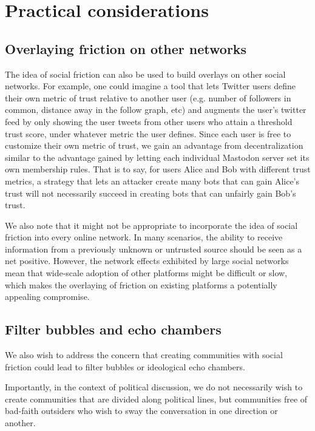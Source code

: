\documentclass[sigconf,authordraft]{acmart}
\begin{document}
\section{Practical considerations}

\subsection{Overlaying friction on other networks}

The idea of social friction can also be used to build overlays on other social networks. For example, one could imagine a tool that lets Twitter users define their own metric of trust relative to another user (e.g. number of followers in common, distance away in the follow graph, etc) and augments the user's twitter feed by only showing the user tweets from other users who attain a threshold trust score, under whatever metric the user defines. Since each user is free to customize their own metric of trust, we gain an advantage from decentralization similar to the advantage gained by letting each individual Mastodon server set its own membership rules. That is to say, for users Alice and Bob with different trust metrics, a strategy that lets an attacker create many bots that can gain Alice's trust will not necessarily succeed in creating bots that can unfairly gain Bob's trust.

We also note that it might not be appropriate to incorporate the idea of social friction into every online network. In many scenarios, the ability to receive information from a previously unknown or untrusted source should be seen as a net positive. However, the network effects \cite{katz1994systems} exhibited by large social networks mean that wide-scale adoption of other platforms might be difficult or slow, which makes the overlaying of friction on existing platforms a potentially appealing compromise.  

\subsection{Filter bubbles and echo chambers}

We also wish to address the concern that creating communities with social friction could lead to filter bubbles \cite{pariser2011filter} or ideological echo chambers. 

Importantly, in the context of political discussion, we do not necessarily wish to create communities that are divided along political lines, but communities free of bad-faith outsiders who wish to sway the conversation in one direction or another. 
\end{document}
